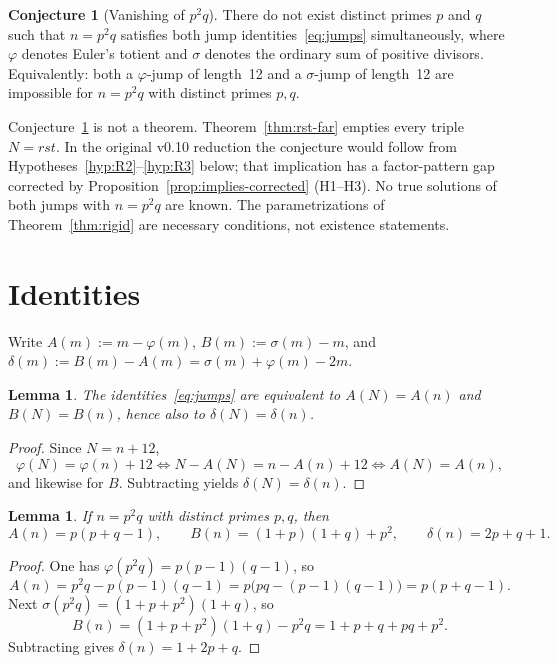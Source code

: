 \documentclass[11pt,reqno]{amsart}
\newcommand{\ph}{\varphi}
\newcommand{\sig}{\sigma}
\newtheorem{lemma}[theorem]{Lemma}
\theoremstyle{definition}
\newtheorem{conjecture}[theorem]{Conjecture}
\begin{document}
\begin{conjecture}[Vanishing of \(p^2q\)]
\label{conj:vanish}
There do not exist distinct primes \(p\) and \(q\) such that \(n=p^2q\) satisfies both jump identities~\eqref{eq:jumps} simultaneously, where \(\ph\) denotes Euler's totient and \(\sig\) denotes the ordinary sum of positive divisors. Equivalently: both a \(\ph\)-jump of length~12 and a \(\sig\)-jump of length~12 are impossible for \(n=p^2q\) with distinct primes \(p,q\).
\end{conjecture}

Conjecture~\ref{conj:vanish} is not a theorem. Theorem~\ref{thm:rst-far} empties every triple \(N=rst\). In the original v0.10 reduction the conjecture would follow from Hypotheses~\ref{hyp:R2}--\ref{hyp:R3} below; that implication has a factor-pattern gap corrected by Proposition~\ref{prop:implies-corrected} (H1--H3). No true solutions of both jumps with \(n=p^2q\) are known. The parametrizations of Theorem~\ref{thm:rigid} are necessary conditions, not existence statements.

\section{Identities}
\label{sec:ident}

Write \(A(m):=m-\ph(m)\), \(B(m):=\sig(m)-m\), and \(\delta(m):=B(m)-A(m)=\sig(m)+\ph(m)-2m\).

\begin{lemma}
\label{lem:equiv}
The identities~\eqref{eq:jumps} are equivalent to \(A(N)=A(n)\) and \(B(N)=B(n)\), hence also to \(\delta(N)=\delta(n)\).
\end{lemma}

\begin{proof}
Since \(N=n+12\),
\[
\ph(N)=\ph(n)+12\iff N-A(N)=n-A(n)+12\iff A(N)=A(n),
\]
and likewise for \(B\). Subtracting yields \(\delta(N)=\delta(n)\).
\end{proof}

\begin{lemma}
\label{lem:AB}
If \(n=p^2q\) with distinct primes \(p,q\), then
\begin{equation}
\label{eq:An}
A(n)=p(p+q-1),\qquad
B(n)=(1+p)(1+q)+p^2,\qquad
\delta(n)=2p+q+1.
\end{equation}
\end{lemma}

\begin{proof}
One has \(\ph(p^2q)=p(p-1)(q-1)\), so
\[
A(n)=p^2q-p(p-1)(q-1)=p\bigl(pq-(p-1)(q-1)\bigr)=p(p+q-1).
\]
Next \(\sig(p^2q)=(1+p+p^2)(1+q)\), so
\[
B(n)=(1+p+p^2)(1+q)-p^2q=1+p+q+pq+p^2.
\]
Subtracting gives \(\delta(n)=1+2p+q\).
\end{proof}
\end{document}
